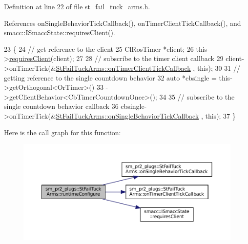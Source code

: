 Definition at line 22 of file st\+\_\+fail\+\_\+tuck\+\_\+arms.\+h.



References on\+Single\+Behavior\+Tick\+Callback(), on\+Timer\+Client\+Tick\+Callback(), and smacc\+::\+I\+Smacc\+State\+::requires\+Client().


\begin{DoxyCode}
23     \{
24         \textcolor{comment}{// get reference to the client}
25         ClRosTimer *client;
26         this->\hyperlink{classsmacc_1_1ISmaccState_a7f95c9f0a6ea2d6f18d1aec0519de4ac}{requiresClient}(client);
27 
28         \textcolor{comment}{// subscribe to the timer client callback}
29         client->onTimerTick(&\hyperlink{structsm__pr2__plugs_1_1StFailTuckArms_a4ef9ad7a1e3f13c41ad1903cc642bcb5}{StFailTuckArms::onTimerClientTickCallback}
      , \textcolor{keyword}{this});
30 
31         \textcolor{comment}{// getting reference to the single countdown behavior}
32         \textcolor{keyword}{auto} *cbsingle = this->getOrthogonal<OrTimer>()
33                              ->getClientBehavior<CbTimerCountdownOnce>();
34 
35         \textcolor{comment}{// subscribe to the single countdown behavior callback}
36         cbsingle->onTimerTick(&\hyperlink{structsm__pr2__plugs_1_1StFailTuckArms_a2e1def8b4845fef3c8ddfed50a7077cc}{StFailTuckArms::onSingleBehaviorTickCallback}
      , \textcolor{keyword}{this});
37     \}
\end{DoxyCode}
Here is the call graph for this function\+:
\nopagebreak
\begin{figure}[H]
\begin{center}
\leavevmode
\includegraphics[width=350pt]{structsm__pr2__plugs_1_1StFailTuckArms_aa120c686b41ea5ab0e55d4545757cc1d_cgraph}
\end{center}
\end{figure}
\mbox{\label{structsm__pr2__plugs_1_1StFailTuckArms_ac23b79659008da8001dfe46ce7e0e8b7}} 
